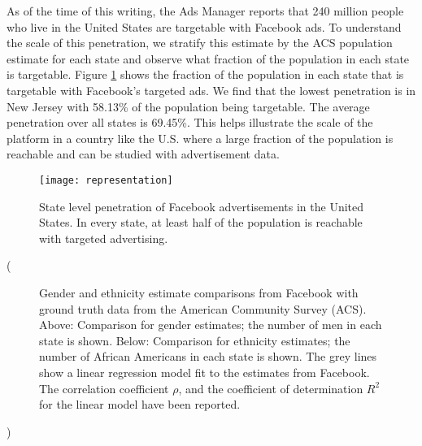 As of the time of this writing, the Ads Manager reports that 240 million people who live in the United States are targetable with Facebook ads. To understand the scale of this penetration, we stratify this estimate by the ACS population estimate for each state and observe what fraction of the population in each state is targetable. Figure \ref{fig:rep_map} shows the fraction of the population in each state that is targetable with Facebook's targeted ads. We find that the lowest penetration is in New Jersey with 58.13\% of the population being targetable. The average penetration over all states is 69.45\%. This helps illustrate the scale of the platform in a country like the U.S. where a large fraction of the population is reachable and can be studied with advertisement data.

\begin{figure}
\centering
\texttt{[image: representation]}
\caption{State level penetration of Facebook advertisements in the United States. In every state, at least half of the population is reachable with targeted advertising.}
\label{fig:rep_map}
\end{figure}

\if(
\begin{figure}
    \centering
    \qquad

    \caption{Gender and ethnicity estimate comparisons from Facebook with ground truth data from the American Community Survey (ACS). Above: Comparison for gender estimates; the number of men in each state is shown. Below: Comparison for ethnicity estimates; the number of African Americans in each state is shown. The grey lines show a linear regression model fit to the estimates from Facebook. The correlation coefficient $\rho$, and the coefficient of determination $R^2$ for the linear model have been reported.}
    \label{fig:corrs}
\end{figure}
)\fi


